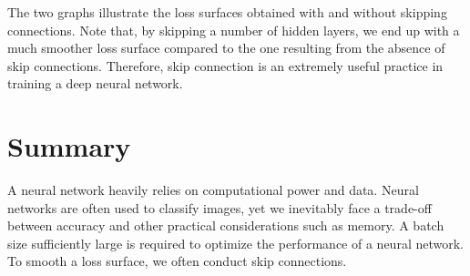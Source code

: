 The two graphs illustrate the loss surfaces obtained with and without skipping connections. Note that, by skipping a number of hidden layers, we end up with a much smoother loss surface compared to the one resulting from the absence of skip connections. Therefore, skip connection is an extremely useful practice in training a deep neural network.
\clearpage

\section{Summary}
A neural network heavily relies on computational power and data. Neural networks are often used to classify images, yet we inevitably face a trade-off between accuracy and other practical considerations such as memory. A batch size sufficiently large is required to optimize the performance of a neural network. To smooth a loss surface, we often conduct skip connections.